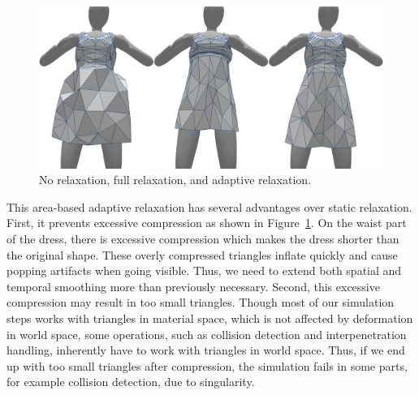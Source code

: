 \documentclass[10pt,journal,compsoc,twoside]{TexInputs/IEEEtran}
\begin{document}
\begin{figure}[t]
  \centering
  \includegraphics[width=1.0\columnwidth]{subelement_compression/no_full_adaptive_compression}
  \caption{No relaxation, full relaxation, and adaptive relaxation.}
  \label{fig:no_full_adaptive}
\end{figure}

This area-based adaptive relaxation has several advantages over static relaxation.  First,
it prevents excessive compression as shown in Figure~\ref{fig:no_full_adaptive}. On the waist part of the
dress, there is excessive compression which makes the dress shorter than the original
shape. These overly compressed triangles inflate quickly and cause popping artifacts when
going visible. Thus, we need to extend both spatial and temporal smoothing more than
previously necessary.  Second, this excessive compression may result in too small
triangles. Though most of our simulation steps works with triangles in material space,
which is not affected by deformation in world space, some operations, such as collision
detection and interpenetration handling, inherently have to work with triangles in world
space.  Thus, if we end up with too small triangles after compression, the simulation
fails in some parts, for example collision detection, due to singularity.
\end{document}
